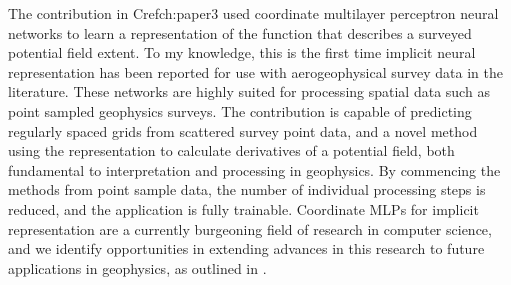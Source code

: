 \documentclass[manuscript.tex]{subfiles}
\begin{document}
The contribution in Cref{ch:paper3} used coordinate multilayer perceptron neural networks to learn a representation of the function that describes a surveyed potential field extent.
To my knowledge, this is the first time implicit neural representation has been reported for use with aerogeophysical survey data in the literature.
These networks are highly suited for processing spatial data such as point sampled geophysics surveys.
The contribution is capable of predicting regularly spaced grids from scattered survey point data, and a novel method using the representation to calculate derivatives of a potential field, both fundamental to interpretation and processing in geophysics.
By commencing the methods from point sample data, the number of individual processing steps is reduced, and the application is fully trainable.
Coordinate MLPs for implicit representation are a currently burgeoning field of research in computer science, and we identify opportunities in extending advances in this research to future applications in geophysics, as outlined in .

\printbibliography{}
\end{document}

